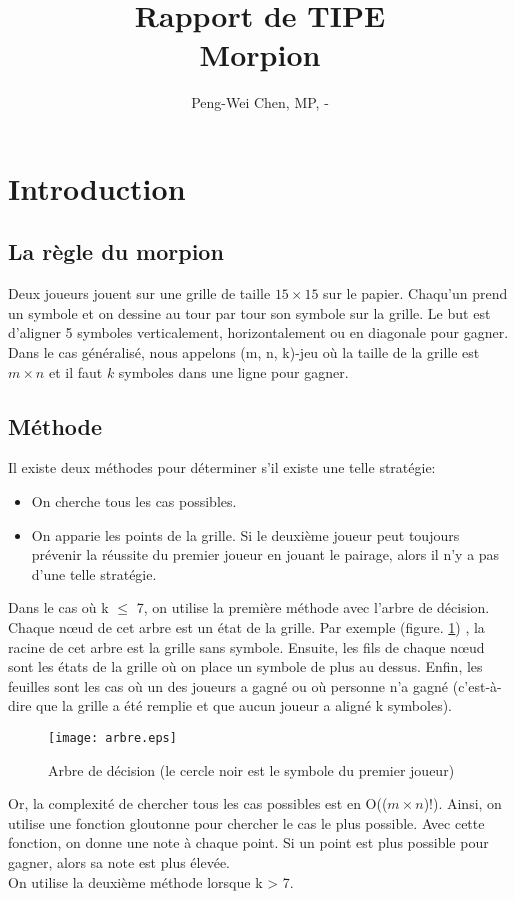 \documentclass[12pt, a4paper]{article}
\title{Rapport de TIPE\\
Morpion}
\author{Peng-Wei Chen, MP, \oldstylenums{2017}-\oldstylenums{2018}}
\begin{document}
\maketitle

\section{Introduction}
\subsection*{La règle du morpion}
Deux joueurs jouent sur une grille de taille $15 \times 15$ sur le papier. Chaqu'un prend un symbole et on dessine au tour par tour son symbole sur la grille. Le but est d'aligner 5 symboles verticalement, horizontalement ou en diagonale pour gagner.
Dans le cas généralisé, nous appelons (m, n, k)-jeu où la taille de la grille est $m \times n$ et il faut $k$ symboles dans une ligne pour gagner.
\subsection*{Méthode}
Il existe deux méthodes pour déterminer s'il existe une telle stratégie:
\begin{itemize}
    \item On cherche tous les cas possibles.
    \item On apparie les points de la grille. Si le deuxième joueur peut toujours prévenir la réussite du premier joueur en jouant le pairage, alors il n'y a pas d'une telle stratégie.
\end{itemize}

Dans le cas où k $\le$ 7, on utilise la première méthode avec l'arbre de décision. Chaque nœud de cet arbre est un état de la grille. Par exemple (figure. \ref{fig:arbre}) , la racine de cet arbre est la grille sans symbole. Ensuite, les fils de chaque nœud sont les états de la grille où on place un symbole de plus au dessus. Enfin, les feuilles sont les cas où un des joueurs a gagné ou où personne n'a gagné (c'est-à-dire que la grille a été remplie et que aucun joueur a aligné k symboles).

\begin{figure}[t]
\centering
\texttt{[image: arbre.eps]}
\caption{Arbre de décision (le cercle noir est le symbole du premier joueur)} \label{fig:arbre}
\end{figure}

Or, la complexité de chercher tous les cas possibles est en O(($m \times n$)!). Ainsi, on utilise une fonction gloutonne pour chercher le cas le \og plus \fg possible. Avec cette fonction, on donne une note à chaque point. Si un point est plus possible pour gagner, alors sa note est plus élevée.
\\
On utilise la deuxième méthode lorsque k > 7.
\end{document}
